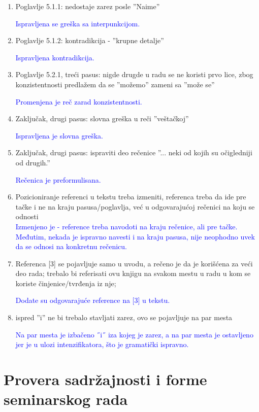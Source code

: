 \documentclass[a4paper]{report}
\newcommand{\odgovor}[1]{\textcolor{blue}{#1}}
\begin{document}
\begin{enumerate}
\item Poglavlje 5.1.1: nedostaje zarez posle ''Naime''

\odgovor{Ispravljena se greška sa interpunkcijom.}

\item Poglavlje 5.1.2: kontradikcija - ''krupne detalje''

\odgovor{Ispravljena kontradikcija.}

\item Poglavlje 5.2.1, treći pasus: nigde drugde u radu se ne koristi prvo lice, zbog konzistentnosti predlažem da se ''možemo'' zameni sa ''može se''

\odgovor{Promenjena je reč zarad konzistentnosti.}

\item Zaključak, drugi pasus: slovna greška u reči ''veštačkoj''

\odgovor{Ispravljena je slovna greška.}

\item Zaključak, drugi pasus: ispraviti deo rečenice ''... neki od kojih su očigledniji od drugih.''

\odgovor{Rečenica je preformulisana.}

\item Pozicioniranje referenci u tekstu treba izmeniti, referenca treba da ide pre tačke i ne na kraju pasusa/poglavlja, već u odgovarajućoj rečenici na koju se odnosti \\
\odgovor{Izmenjeno je - reference treba navodoti na kraju rečenice, ali pre tačke. Međutim, nekada je ispravno navesti i na kraju pasusa, nije neophodno uvek da se odnosi na konkretnu rečenicu.}

\item Referenca [3] se pojavljuje samo u uvodu, a rečeno je da je korišćena za veći deo rada; trebalo bi referisati ovu knjigu na svakom mestu u radu u kom se koriste činjenice/tvrđenja iz nje; 

\odgovor{Dodate su odgovarajuće reference na [3] u tekstu.}

\item ispred ''i'' ne bi trebalo stavljati zarez, ovo se pojavljuje na par mesta

\odgovor{Na par mesta je izbačeno ˝i˝ iza kojeg je zarez, a na par mesta je ostavljeno jer je u ulozi intenzifikatora, što je gramatički ispravno.}

\end{enumerate}


\section{Provera sadržajnosti i forme seminarskog rada}
\end{document}
